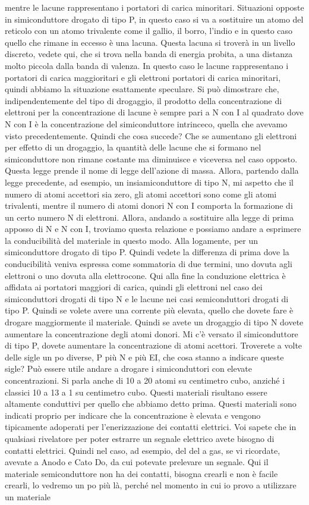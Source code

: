 {mentre le lacune rappresentano i portatori di carica minoritari. Situazioni opposte in simiconduttore drogato di tipo P, in questo caso si va a sostituire un atomo del reticolo con un atomo trivalente come il gallio, il borro, l'indio e in questo caso quello che rimane in eccesso è una lacuna. Questa lacuna si troverà in un livello discreto, vedete qui, che si trova nella banda di energia probita, a una distanza molto piccola dalla banda di valenza. In questo caso le lacune rappresentano i portatori di carica maggioritari e gli elettroni portatori di carica minoritari, quindi abbiamo la situazione esattamente speculare. Si può dimostrare che, indipendentemente del tipo di drogaggio, il prodotto della concentrazione di elettroni per la concentrazione di lacune è sempre pari a N con I al quadrato dove N con I è la concentrazione del simiconduttore intrinceco, quella che avevamo visto precedentemente. Quindi che cosa succede? Che se aumentano gli elettroni per effetto di un drogaggio, la quantità delle lacune che si formano nel simiconduttore non rimane costante ma diminuisce e viceversa nel caso opposto. Questa legge prende il nome di legge dell'azione di massa. Allora, partendo dalla legge precedente, ad esempio, un insiamiconduttore di tipo N, mi aspetto che il numero di atomi accettori sia zero, gli atomi accettori sono come gli atomi trivalenti, mentre il numero di atomi donori N con I comporta la formazione di un certo numero N di elettroni. Allora, andando a sostituire alla legge di prima apposso di N e N con I, troviamo questa relazione e possiamo andare a esprimere la conducibilità del materiale in questo modo. Alla logamente, per un simiconduttore drogato di tipo P. Quindi vedete la differenza di prima dove la conducibilità veniva espressa come sommatoria di due termini, uno dovuta agli elettroni o uno dovuta alla elettrocone. Qui alla fine la conduzione elettrica è affidata ai portatori maggiori di carica, quindi gli elettroni nel caso dei simiconduttori drogati di tipo N e le lacune nei casi semiconduttori drogati di tipo P. Quindi se volete avere una corrente più elevata, quello che dovete fare è drogare maggiormente il materiale. Quindi se avete un drogaggio di tipo N dovete aumentare la concentrazione degli atomi donori. Mi c'è versato il simiconduttore di tipo P, dovete aumentare la concentrazione di atomi acettori. Troverete a volte delle sigle un po diverse, P più N e più EI, che cosa stanno a indicare queste sigle? Può essere utile andare a drogare i simiconduttori con elevate concentrazioni. Si parla anche di 10 a 20 atomi su centimetro cubo, anziché i classici 10 a 13 a 1 su centimetro cubo. Questi materiali risultano essere altamente conduttivi per quello che abbiamo detto prima. Questi materiali sono indicati proprio per indicare che la concentrazione è elevata e vengono tipicamente adoperati per l'enerizzazione dei contatti elettrici. Voi sapete che in qualsiasi rivelatore per poter estrarre un segnale elettrico avete bisogno di contatti elettrici. Quindi nel caso, ad esempio, del del a gas, se vi ricordate, avevate a Anodo e Cato Do, da cui potevate prelevare un segnale. Qui il materiale semiconduttore non ha dei contatti, bisogna crearli e non è facile crearli, lo vedremo un po più là, perché nel momento in cui io provo a utilizzare un materiale }

